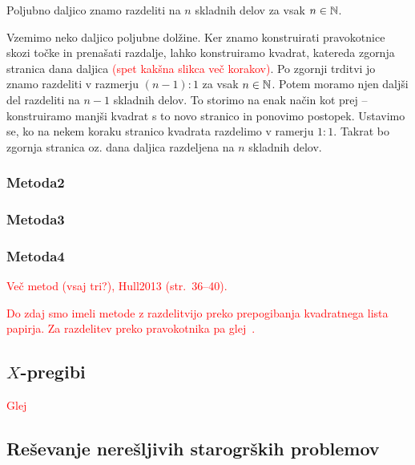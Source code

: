 \begin{posledica}
    Poljubno daljico znamo razdeliti na $n$ skladnih delov za vsak $n \in \mathbb N$.
\end{posledica}

\begin{dokaz}
    Vzemimo neko daljico poljubne dolžine. Ker znamo konstruirati pravokotnice skozi točke in prenašati razdalje, lahko konstruiramo kvadrat, katereda zgornja stranica dana daljica \textcolor{red}{(spet kakšna slikca več korakov)}. Po zgornji trditvi jo znamo razdeliti v razmerju $(n-1) : 1$ za vsak $n \in \mathbb N$. Potem moramo njen daljši del razdeliti na $n-1$ skladnih delov. To storimo na enak način kot prej -- konstruiramo manjši kvadrat s to novo stranico in ponovimo postopek. Ustavimo se, ko na nekem koraku stranico kvadrata razdelimo v ramerju $1:1$. Takrat bo zgornja stranica oz. dana daljica razdeljena na $n$ skladnih delov.
\end{dokaz}

\subsubsection*{Metoda2}

\subsubsection*{Metoda3}

\subsubsection*{Metoda4}

\textcolor{red}{Več metod (vsaj tri?), Hull2013 (str.\ 36--40).}

\textcolor{red}{Do zdaj smo imeli metode z razdelitvijo preko prepogibanja kvadratnega lista papirja. Za razdelitev preko pravokotnika pa glej~\cite[str.\ 107--134]{haga2008}.}

\subsection{$X$-pregibi}

\textcolor{red}{Glej~\cite[str.\ 33--44]{haga2008}}


\subsection{Reševanje nerešljivih starogrških problemov}
\label{podpogl:starogrskiproblemi}

